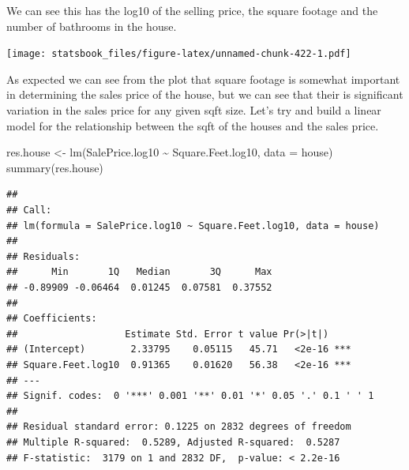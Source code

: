\documentclass[
]{book}
\newenvironment{Shaded}{\begin{snugshade}}{\end{snugshade}}
\newcommand{\AttributeTok}[1]{\textcolor[rgb]{0.77,0.63,0.00}{#1}}
\newcommand{\FloatTok}[1]{\textcolor[rgb]{0.00,0.00,0.81}{#1}}
\newcommand{\FunctionTok}[1]{\textcolor[rgb]{0.00,0.00,0.00}{#1}}
\newcommand{\NormalTok}[1]{#1}
\newcommand{\OtherTok}[1]{\textcolor[rgb]{0.56,0.35,0.01}{#1}}
\newcommand{\SpecialCharTok}[1]{\textcolor[rgb]{0.00,0.00,0.00}{#1}}
\newcommand{\StringTok}[1]{\textcolor[rgb]{0.31,0.60,0.02}{#1}}
\theoremstyle{definition}
\theoremstyle{definition}
\theoremstyle{definition}
\theoremstyle{definition}
\theoremstyle{remark}
\begin{document}
We can see this has the log10 of the selling price, the square footage and the number of bathrooms in the house.

\begin{Shaded}
\end{Shaded}

\texttt{[image: statsbook\_files/figure-latex/unnamed-chunk-422-1.pdf]}

As expected we can see from the plot that square footage is somewhat important in determining the sales price of the house, but we can see that their is significant variation in the sales price for any given sqft size. Let's try and build a linear model for the relationship between the sqft of the houses and the sales price.

\begin{Shaded}
\begin{Highlighting}[]
\NormalTok{res.house }\OtherTok{\textless{}{-}} \FunctionTok{lm}\NormalTok{(SalePrice.log10 }\SpecialCharTok{\textasciitilde{}}\NormalTok{ Square.Feet.log10, }\AttributeTok{data =}\NormalTok{ house)}
\FunctionTok{summary}\NormalTok{(res.house)}
\end{Highlighting}
\end{Shaded}

\begin{verbatim}
## 
## Call:
## lm(formula = SalePrice.log10 ~ Square.Feet.log10, data = house)
## 
## Residuals:
##      Min       1Q   Median       3Q      Max 
## -0.89909 -0.06464  0.01245  0.07581  0.37552 
## 
## Coefficients:
##                   Estimate Std. Error t value Pr(>|t|)    
## (Intercept)        2.33795    0.05115   45.71   <2e-16 ***
## Square.Feet.log10  0.91365    0.01620   56.38   <2e-16 ***
## ---
## Signif. codes:  0 '***' 0.001 '**' 0.01 '*' 0.05 '.' 0.1 ' ' 1
## 
## Residual standard error: 0.1225 on 2832 degrees of freedom
## Multiple R-squared:  0.5289, Adjusted R-squared:  0.5287 
## F-statistic:  3179 on 1 and 2832 DF,  p-value: < 2.2e-16
\end{verbatim}
\end{document}

